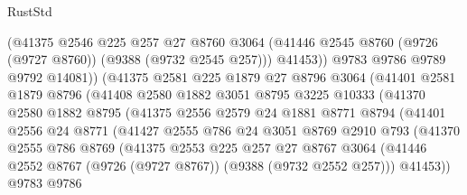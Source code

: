 \begin{lexlean}{RustStd}
\begin{coremodule}
                        (@41375
                          @2546
                          @225
                          @257
                          @27
                          @8760
                          @3064
                          (@41446 @2545 @8760 (@9726 (@9727 @8760)) (@9388 (@9732 @2545 @257)))
                          @41453))
                      @9783
                      @9786
                      @9789
                      @9792
                      @14081))
                  (@41375
                    @2581
                    @225
                    @1879
                    @27
                    @8796
                    @3064
                    (@41401
                      @2581
                      @1879
                      @8796
                      (@41408
                        @2580
                        @1882
                        @3051
                        @8795
                        @3225
                        @10333
                        (@41370
                          @2580
                          @1882
                          @8795
                          (@41375
                            @2556
                            @2579
                            @24
                            @1881
                            @8771
                            @8794
                            (@41401
                              @2556
                              @24
                              @8771
                              (@41427
                                @2555
                                @786
                                @24
                                @3051
                                @8769
                                @2910
                                @793
                                (@41370
                                  @2555
                                  @786
                                  @8769
                                  (@41375
                                    @2553
                                    @225
                                    @257
                                    @27
                                    @8767
                                    @3064
                                    (@41446
                                      @2552
                                      @8767
                                      (@9726 (@9727 @8767))
                                      (@9388 (@9732 @2552 @257)))
                                    @41453))
                                @9783
                                @9786

\end{coremodule}
\end{lexlean}
